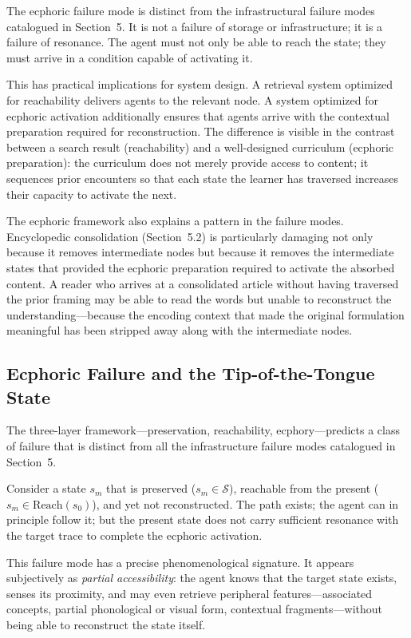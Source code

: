 \documentclass[12pt]{article}
\newcommand{\sS}{\mathcal{S}}
\newcommand{\reach}{\mathrm{Reach}}
\begin{document}
The ecphoric failure mode is distinct from the infrastructural failure modes
catalogued in Section~5.
It is not a failure of storage or infrastructure; it is a failure
of resonance.
The agent must not only be able to reach the state; they must arrive in
a condition capable of activating it.

This has practical implications for system design.
A retrieval system optimized for reachability delivers agents to the
relevant node.
A system optimized for ecphoric activation additionally ensures that
agents arrive with the contextual preparation required for reconstruction.
The difference is visible in the contrast between a search result
(reachability) and a well-designed curriculum (ecphoric preparation):
the curriculum does not merely provide access to content; it sequences
prior encounters so that each state the learner has traversed increases
their capacity to activate the next.

The ecphoric framework also explains a pattern in the failure modes.
Encyclopedic consolidation (Section~5.2) is particularly damaging not
only because it removes intermediate nodes but because it removes the
intermediate states that provided the ecphoric preparation required to
activate the absorbed content.
A reader who arrives at a consolidated article without having traversed
the prior framing may be able to read the words but unable to reconstruct
the understanding---because the encoding context that made the original
formulation meaningful has been stripped away along with the intermediate
nodes.

\subsection{Ecphoric Failure and the Tip-of-the-Tongue State}

The three-layer framework---preservation, reachability, ecphory---predicts
a class of failure that is distinct from all the infrastructure failure
modes catalogued in Section~5.

Consider a state $s_m$ that is preserved ($s_m \in \sS$), reachable from
the present ($s_m \in \reach(s_0)$), and yet not reconstructed.
The path exists; the agent can in principle follow it; but the present
state does not carry sufficient resonance with the target trace to
complete the ecphoric activation.

This failure mode has a precise phenomenological signature.
It appears subjectively as \emph{partial accessibility}: the agent knows
that the target state exists, senses its proximity, and may even retrieve
peripheral features---associated concepts, partial phonological or visual
form, contextual fragments---without being able to reconstruct the state
itself.
\end{document}
